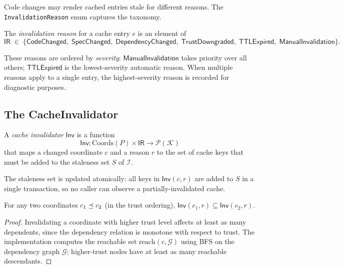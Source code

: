 \documentclass[11pt]{article}
\newcommand{\CacheIndex}{\mathcal{I}}              %
\newcommand{\InvalReason}{\mathsf{IR}}             %
\newcommand{\CacheInval}{\mathsf{Inv}}             %
\newcommand{\DepGraph}{\mathcal{G}}                %
\newcommand{\reachable}{\mathrm{reach}}            %
\begin{document}
Code changes may render cached entries stale for different reasons.
The \texttt{InvalidationReason} enum captures the taxonomy.

\begin{definition}\label{def:inval-reason}
The \emph{invalidation reason} for a cache entry $e$ is an element of
\[
  \InvalReason \;\in\;
  \{\mathsf{CodeChanged},\;
    \mathsf{SpecChanged},\;
    \mathsf{DependencyChanged},\;
    \mathsf{TrustDowngraded},\;
    \mathsf{TTLExpired},\;
    \mathsf{ManualInvalidation}\}.
\]
\end{definition}

These reasons are ordered by \emph{severity}:
$\mathsf{ManualInvalidation}$ takes priority over all others;
$\mathsf{TTLExpired}$ is the lowest-severity automatic reason.  When
multiple reasons apply to a single entry, the highest-severity reason
is recorded for diagnostic purposes.

\subsection{The CacheInvalidator}

\begin{definition}\label{def:cache-inval}
A \emph{cache invalidator} $\CacheInval$ is a function
\[
  \CacheInval : \mathrm{Coords}(P) \times \InvalReason
               \to \mathcal{P}(\mathcal{K})
\]
that maps a changed coordinate $c$ and a reason $r$ to the set of
cache keys that must be added to the staleness set $S$ of
$\CacheIndex$.
\end{definition}

The staleness set is updated atomically: all keys in
$\CacheInval(c, r)$ are added to $S$ in a single transaction, so no
caller can observe a partially-invalidated cache.

\begin{lemma}\label{lem:mono-inval}
For any two coordinates $c_1 \preceq c_2$ (in the trust ordering),
$\CacheInval(c_1, r) \subseteq \CacheInval(c_2, r)$.
\end{lemma}
\begin{proof}
Invalidating a coordinate with higher trust level affects at least
as many dependents, since the dependency relation is monotone with
respect to trust.  The implementation computes the reachable set
$\reachable(c, \DepGraph)$ using BFS on the dependency graph
$\DepGraph$; higher-trust nodes have at least as many reachable
descendants.
\end{proof}
\end{document}
